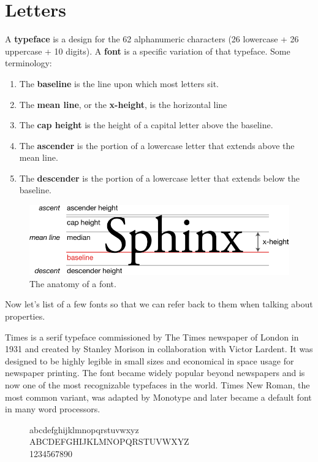 \section{Letters} 

  \begin{definition}
    A \textbf{typeface} is a design for the 62 alphanumeric characters (26 lowercase + 26 uppercase + 10 digits). A \textbf{font} is a specific variation of that typeface. Some terminology: 
    \begin{enumerate}
      \item The \textbf{baseline} is the line upon which most letters sit. 
      \item The \textbf{mean line}, or the \textbf{x-height}, is the horizontal line 
      \item The \textbf{cap height} is the height of a capital letter above the baseline. 
      \item The \textbf{ascender} is the portion of a lowercase letter that extends above the mean line. 
      \item The \textbf{descender} is the portion of a lowercase letter that extends below the baseline. 
    \end{enumerate}

    \begin{figure}[H]
      \centering 
      \includegraphics[scale=0.4]{img/typography.png}
      \caption{The anatomy of a font. } 
      \label{fig:typography}
    \end{figure}
  \end{definition}

  Now let's list of a few fonts so that we can refer back to them when talking about properties. 

  \begin{example}[Times]
    Times is a serif typeface commissioned by The Times newspaper of London in 1931 and created by Stanley Morison in collaboration with Victor Lardent. It was designed to be highly legible in small sizes and economical in space usage for newspaper printing. The font became widely popular beyond newspapers and is now one of the most recognizable typefaces in the world. Times New Roman, the most common variant, was adapted by Monotype and later became a default font in many word processors. 
    
    \begin{figure}[H]
      \selectfont 
      \huge
      \raggedright
      abcdefghijklmnopqrstuvwxyz \\
      ABCDEFGHIJKLMNOPQRSTUVWXYZ \\
      1234567890
    \end{figure}
  \end{example}


